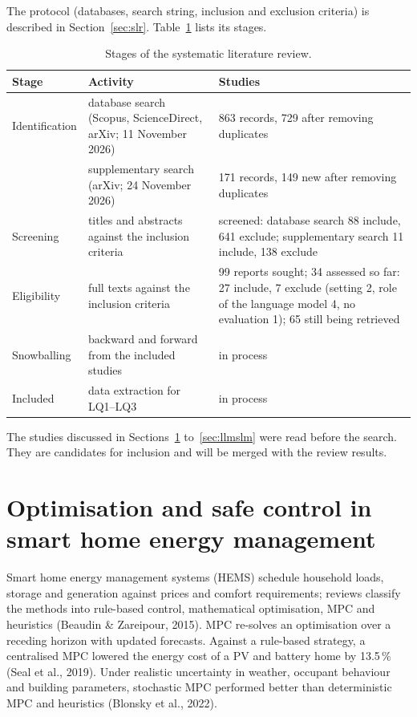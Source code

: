 \documentclass[12pt,a4paper]{report}
\begin{document}
The protocol (databases, search string, inclusion and exclusion
criteria) is described in Section~\ref{sec:slr}. Table~\ref{tab:slrstages}
lists its stages.

\begin{table}[htbp]
\caption{Stages of the systematic literature review.}
\label{tab:slrstages}
\small
\begin{tabularx}{\textwidth}{@{}p{2.3cm}XX@{}}
\toprule
Stage & Activity & Studies \\
\midrule
Identification & database search (Scopus, ScienceDirect, arXiv; 11 November 2026) & 863 records, 729 after removing duplicates \\
 & supplementary search (arXiv; 24 November 2026) & 171 records, 149 new after removing duplicates \\
Screening & titles and abstracts against the inclusion criteria & screened: database search 88 include, 641 exclude; supplementary search 11 include, 138 exclude \\
Eligibility & full texts against the inclusion criteria & 99 reports sought; 34 assessed so far: 27 include, 7 exclude (setting 2, role of the language model 4, no evaluation 1); 65 still being retrieved \\
Snowballing & backward and forward from the included studies & in process \\
Included & data extraction for LQ1--LQ3 & in process \\
\bottomrule
\end{tabularx}
\end{table}

The studies discussed in Sections~\ref{sec:lithems} to~\ref{sec:llmslm}
were read before the search. They are candidates for inclusion and will
be merged with the review results.

\section{Optimisation and safe control in smart home energy management}
\label{sec:lithems}

Smart home energy management systems (HEMS) schedule household loads, storage
and generation against prices and comfort requirements; reviews classify
the methods into rule-based control, mathematical optimisation, MPC and
heuristics (Beaudin \& Zareipour, 2015). MPC re-solves an optimisation over a
receding horizon with updated forecasts. Against a rule-based strategy,
a centralised MPC lowered the energy cost of a PV and battery home by
13.5\,\% (Seal et al., 2019). Under realistic uncertainty in weather,
occupant behaviour and building parameters, stochastic MPC performed
better than deterministic MPC and heuristics (Blonsky et al., 2022).
\end{document}
